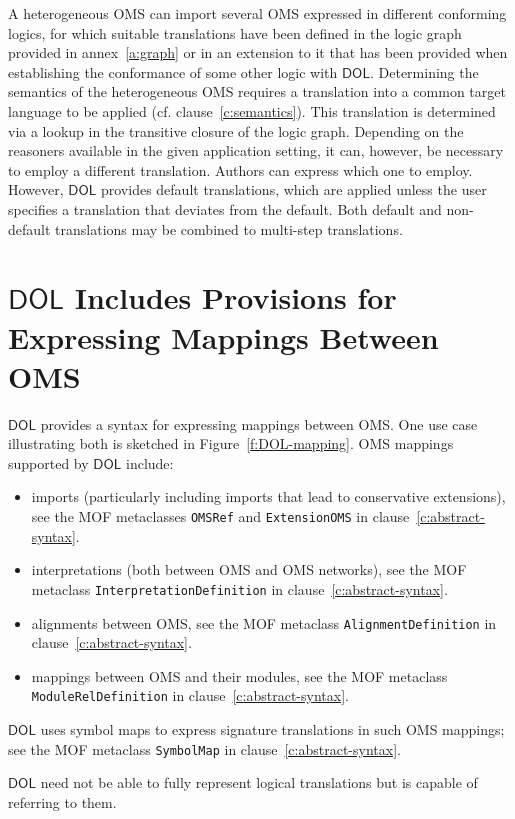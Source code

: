 \documentclass[10pt,fleqn,final]{scrreprt}
\makeatletter
\newcommand{\cbs}[0]{\color{red}\xspace} %
\newcommand{\cbe}[0]{\color{black}\xspace} %
\newcommand*{\cf}{cf.\@\xspace}
\newcommand*{\syntax}[1]{\texttt{#1}}
\newcommand*{\DOL}{\ensuremath{\mathsf{DOL}}\xspace}
\newcommand{\annexrefname}{annex}
\newcommand{\clauserefname}{clause}
\newcommand{\figurerefname}{Figure}
\newcommand{\aref}[1]{\annexrefname~\ref{#1}}
\newcommand{\cref}[1]{\clauserefname~\ref{#1}}
\newcommand{\fref}[1]{\figurerefname~\ref{#1}}
\newenvironment{definitions}[0]{\medskip }{}
\makeatother
\begin{document}
\begin{definitions}
A heterogeneous OMS can import several OMS expressed in different
conforming logics, for which suitable translations have been defined
in the logic graph provided in \aref{a:graph} or in an extension to it
that has been provided when establishing the conformance of some other
logic with \DOL.  Determining the semantics of the heterogeneous OMS
requires a translation into a common target language to be applied
(\cf \cref{c:semantics}).  This translation is determined via a lookup
in the transitive closure of the logic graph.  Depending on the
reasoners available in the given application setting, it can, however,
be necessary to employ a different translation.  Authors can express
which one to employ.  \cbs However, \DOL provides default translations, which are 
applied unless the user specifies a translation that deviates from the default. Both default and non-default translations may be combined to multi-step translations.\cbe 

\section{\DOL Includes Provisions for Expressing Mappings Between OMS}\label{c:req:links}

\DOL provides a syntax for expressing mappings between OMS.  One use case illustrating both is sketched in  \fref{f:DOL-mapping}.  OMS mappings supported by \DOL include:
\begin{itemize}
\item imports (particularly including imports that lead to conservative extensions), see the
\cbs MOF metaclasses \cbe  \syntax{OMSRef} and \syntax{ExtensionOMS} in
clause~\ref{c:abstract-syntax}.
\item interpretations (both between OMS and OMS networks), see the
\cbs MOF metaclass \cbe  \syntax{InterpretationDefinition} in
clause~\ref{c:abstract-syntax}.
\item alignments between OMS, see the
\cbs MOF metaclass \cbe  \syntax{AlignmentDefinition} in
clause~\ref{c:abstract-syntax}.
\item mappings between OMS and their modules, see the
\cbs MOF metaclass \cbe  \syntax{ModuleRelDefinition} in
clause~\ref{c:abstract-syntax}.
\end{itemize}
\DOL uses symbol maps to express signature translations in such OMS mappings; see the
\cbs MOF metaclass \cbe  \syntax{SymbolMap} in
clause~\ref{c:abstract-syntax}.

\DOL need not be able to fully represent logical translations but is
capable of referring to them.


\end{definitions}
\end{document}
